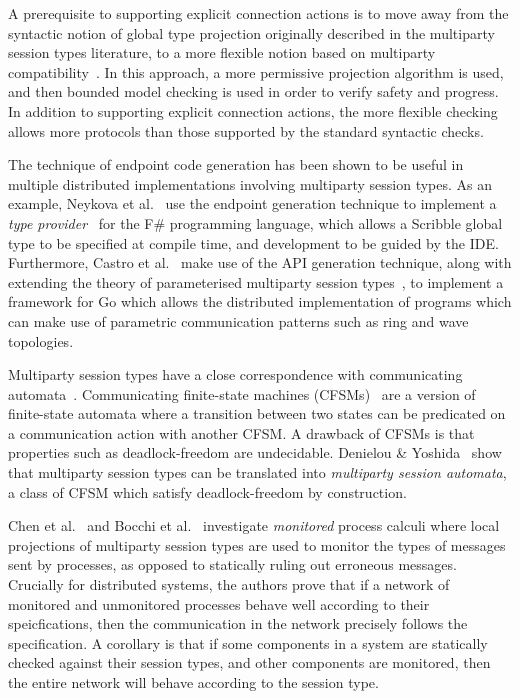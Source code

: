 \documentclass[
graybox,
envcountchap
]{svmult}
\begin{document}
\begin{bibunit}
  A prerequisite to supporting explicit connection actions is to move away from
  the syntactic notion of global type projection originally described in the
  multiparty session types literature, to a more flexible notion based on
  multiparty compatibility~\cite{DenielouY13:multiparty-compatibility}. In this
  approach, a more permissive projection algorithm is used, and then bounded
  model checking is used in order to verify safety and progress. In addition to
  supporting explicit connection actions, the more flexible checking allows more
  protocols than those supported by the standard syntactic checks.

  The technique of endpoint code generation has been shown to be useful in
  multiple distributed implementations involving multiparty session types. As an
  example, Neykova et al.~\cite{neykovaHYA18:session-type-provider} use the
  endpoint generation technique to implement a \emph{type
  provider}~\cite{PetricekGS16:type-providers}
  for the F\# programming language, which allows a Scribble global type to be
  specified at compile time, and development to be guided by the IDE.
  Furthermore, Castro et al.~\cite{CastroHJNY19:param-go} make use of the API generation
  technique, along with extending the theory of parameterised multiparty session
  types~\cite{DenielouYBH12:param-mpst}, to implement a framework for Go which
  allows the distributed implementation of programs which can make use of
  parametric communication patterns such as ring and wave topologies.

  Multiparty session types have a close correspondence with communicating
  automata~\cite{DenielouY12:mpst-automata}. Communicating finite-state
  machines (CFSMs)~\cite{BrandZ83:cfsms} are a version of finite-state automata
  where a transition between two states can be predicated on a communication
  action with another CFSM. A drawback of CFSMs is that properties such as
  deadlock-freedom are undecidable. Denielou \&
  Yoshida~\cite{DenielouY12:mpst-automata} show that multiparty session types
  can be translated into \emph{multiparty session automata}, a class of CFSM
  which satisfy deadlock-freedom by construction.

  Chen et al.~\cite{ChenBDHY11:monitoring} and Bocchi et
  al.~\cite{BocchiCDHY13:monitoring} investigate \emph{monitored} process
  calculi where local projections of multiparty session types are used to
  monitor the types of messages sent by processes, as opposed to statically
  ruling out erroneous messages. Crucially for distributed systems,
  the authors prove that if a network of monitored and unmonitored processes
  behave well according to their speicfications, then the communication in the
  network precisely follows the specification. A corollary is that if some
  components in a system are statically checked against their session types, and
  other components are monitored, then the entire network will behave according
  to the session type.


\end{bibunit}
\end{document}
